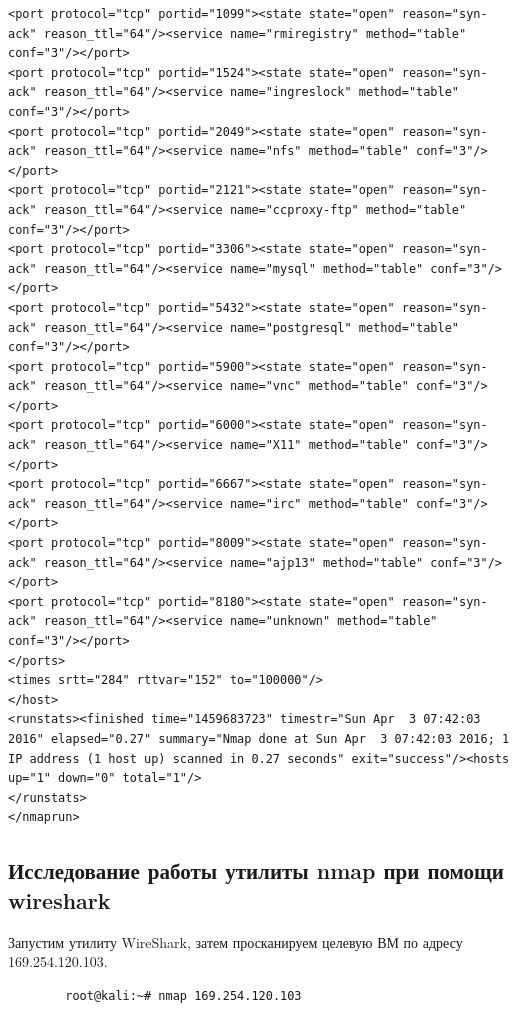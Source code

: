 \documentclass[10pt,a4paper]{report}
\begin{document}
\begin{verbatim}
<port protocol="tcp" portid="1099"><state state="open" reason="syn-ack" reason_ttl="64"/><service name="rmiregistry" method="table" conf="3"/></port>
<port protocol="tcp" portid="1524"><state state="open" reason="syn-ack" reason_ttl="64"/><service name="ingreslock" method="table" conf="3"/></port>
<port protocol="tcp" portid="2049"><state state="open" reason="syn-ack" reason_ttl="64"/><service name="nfs" method="table" conf="3"/></port>
<port protocol="tcp" portid="2121"><state state="open" reason="syn-ack" reason_ttl="64"/><service name="ccproxy-ftp" method="table" conf="3"/></port>
<port protocol="tcp" portid="3306"><state state="open" reason="syn-ack" reason_ttl="64"/><service name="mysql" method="table" conf="3"/></port>
<port protocol="tcp" portid="5432"><state state="open" reason="syn-ack" reason_ttl="64"/><service name="postgresql" method="table" conf="3"/></port>
<port protocol="tcp" portid="5900"><state state="open" reason="syn-ack" reason_ttl="64"/><service name="vnc" method="table" conf="3"/></port>
<port protocol="tcp" portid="6000"><state state="open" reason="syn-ack" reason_ttl="64"/><service name="X11" method="table" conf="3"/></port>
<port protocol="tcp" portid="6667"><state state="open" reason="syn-ack" reason_ttl="64"/><service name="irc" method="table" conf="3"/></port>
<port protocol="tcp" portid="8009"><state state="open" reason="syn-ack" reason_ttl="64"/><service name="ajp13" method="table" conf="3"/></port>
<port protocol="tcp" portid="8180"><state state="open" reason="syn-ack" reason_ttl="64"/><service name="unknown" method="table" conf="3"/></port>
</ports>
<times srtt="284" rttvar="152" to="100000"/>
</host>
<runstats><finished time="1459683723" timestr="Sun Apr  3 07:42:03 2016" elapsed="0.27" summary="Nmap done at Sun Apr  3 07:42:03 2016; 1 IP address (1 host up) scanned in 0.27 seconds" exit="success"/><hosts up="1" down="0" total="1"/>
</runstats>
</nmaprun>

		\end{verbatim}
	\subsection{Исследование работы утилиты nmap при помощи wireshark}
	
	Запустим утилиту WireShark, затем просканируем целевую ВМ по адресу 169.254.120.103.
		\begin{verbatim}
		root@kali:~# nmap 169.254.120.103
		\end{verbatim}
\end{document}
